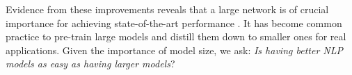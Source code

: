 Evidence from these improvements reveals that a large network is of crucial importance for achieving state-of-the-art performance \citep{devlin2018bert, radford2019language}. It has become common practice to pre-train large models and distill them down to smaller ones \citep{sun2019patient, turc2019well} for real applications. Given the importance of model size, we ask: \textit{Is having better NLP models as easy as having larger models}? 










